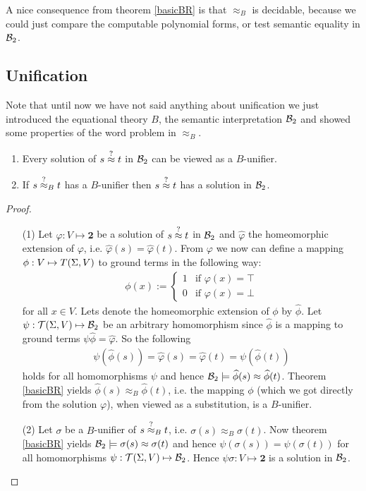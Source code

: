 		A nice consequence from theorem \ref{basicBR} is that $\approx_B$ is decidable, because we could just compare the computable polynomial forms, or test semantic equality in ${\mathcal{B}_2}$.
		\subsection{Unification}
		Note that until now we have not said anything about unification we just introduced the equational theory $B$, the semantic interpretation ${\mathcal{B}_2}$ and showed some properties of the word problem in $\approx_B$.
		\begin{lemma}\mbox{}
		\begin{enumerate}
		\item Every solution of $s\stackrel{?}{\approx} t$ in ${\mathcal{B}_2}$ can be viewed as a $B$-unifier.
		\item If $s\stackrel{?}{\approx}_B t$ has a $B$-unifier then $s\stackrel{?}{\approx} t$ has a solution in ${\mathcal{B}_2}$.
		\end{enumerate}
		\end{lemma}
		\begin{proof}\mbox{}
		\begin{itemize}
		\item[(1)]Let $\varphi:V\mapsto\textbf{2}$ be a solution of $s\stackrel{?}{\approx} t$ in ${\mathcal{B}_2}$ and $\widehat{\varphi}$ the homeomorphic extension of $\varphi$, i.e. $\widehat{\varphi}(s)=\widehat{\varphi}(t)$. From $\varphi$ we now can define a mapping $\phi:V\mapsto T(\Sigma,V)$ to ground terms in the following way:
		\begin{align*}
		\phi(x):=\begin{cases}
		1 & \text{if }\varphi(x)=\top\\
		0 & \text{if }\varphi(x)=\bot
		\end{cases}
		\end{align*}
		for all $x\in V$. Lets denote the homeomorphic extension of $\phi$ by $\widehat{\phi}$. Let $\psi:\mathcal{T}(\Sigma,V)\mapsto{\mathcal{B}_2}$ be an arbitrary homomorphism since $\widehat{\phi}$ is a mapping to ground terms $\psi\widehat{\phi}=\widehat{\varphi}$. So the following
		\begin{align*}
		\psi\left( \widehat{\phi}(s)\right)=\widehat{\varphi}(s)=\widehat{\varphi}(t)=\psi\left( \widehat{\phi}(t)\right) 
		\end{align*}
		holds for all homomorphisms $\psi$ and hence ${\mathcal{B}_2}\models\widehat{\phi}(s)\approx\widehat{\phi}(t)$. Theorem \ref{basicBR} yields $\widehat{\phi}(s)\approx_B\widehat{\phi}(t)$, i.e. the mapping $\phi$ (which we got directly from the solution $\varphi$), when viewed as a substitution, is a $B$-unifier.
		\item[(2)] Let $\sigma$ be a $B$-unifier of $s\stackrel{?}{\approx}_B t$, i.e. $\sigma(s)\approx_B\sigma(t)$. Now theorem \ref{basicBR} yields ${\mathcal{B}_2}\models\sigma(s)\approx\sigma(t)$ and hence $\psi\left(\sigma (s)\right)=\psi\left(\sigma (t)\right)$ for all homomorphisms $\psi:\mathcal{T}(\Sigma,V)\mapsto{\mathcal{B}_2}$. Hence $\psi\sigma:V\mapsto\textbf{2}$ is a solution in ${\mathcal{B}_2}$.
		\end{itemize}
		\end{proof}